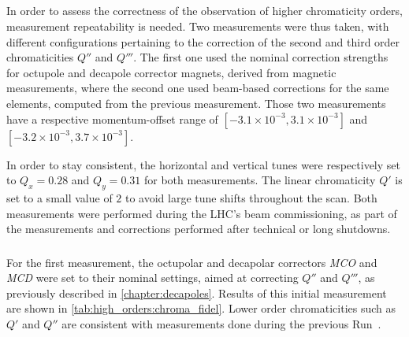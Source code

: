 \subsection{}

In order to assess the correctness of the observation of higher chromaticity orders, measurement
repeatability is needed. Two measurements were thus taken, with different configurations pertaining
to the correction of the second and third order chromaticities $Q''$ and $Q'''$.
The first one used the nominal correction strengths for octupole and decapole corrector magnets,
derived from magnetic measurements, where the second one used beam-based corrections for the same
elements, computed from the previous measurement. 
Those two measurements have a respective momentum-offset range of $[-3.1 \times 10^{-3}, 3.1 \times
10^{-3}]$ and $[-3.2 \times 10^{-3}, 3.7 \times 10^{-3}]$.

In order to stay consistent, the horizontal and vertical tunes were respectively set to $Q_x = 0.28$
and $Q_y = 0.31$ for both measurements. The linear chromaticity $Q'$ is set to a small value of $2$
to avoid large tune shifts throughout the scan.
Both measurements were performed during the LHC's beam commissioning, as part of the measurements
and corrections performed after technical or long shutdowns.


\subsubsection{}

For the first measurement, the octupolar and decapolar correctors \textit{MCO} and \textit{MCD} were
set to their nominal settings, aimed at correcting $Q''$ and $Q'''$, as previously described in
\cref{chapter:decapoles}.
Results of this initial measurement are shown in \cref{tab:high_orders:chroma_fidel}. Lower order
chromaticities such as $Q'$ and $Q''$ are consistent with measurements done during the previous 
Run~\cite{maclean_commissioning_2016}.

